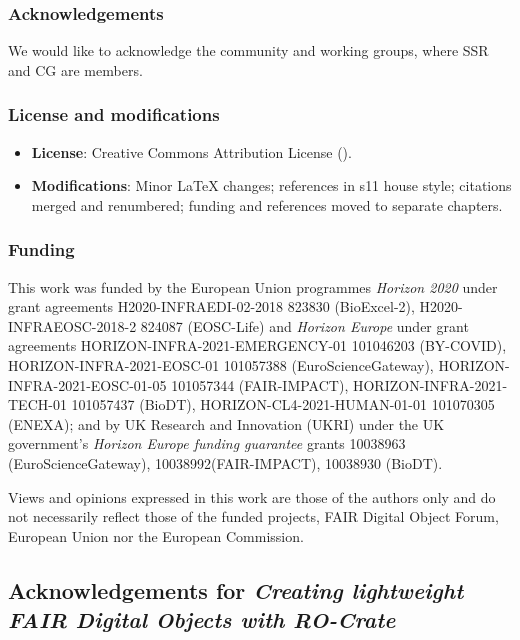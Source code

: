 \subsubsection*{Acknowledgements}

We would like to acknowledge the  community and working groups, where SSR and CG are members.


\subsubsection*{License and modifications}

\begin{itemize}
\tightlist
\item
  \textbf{License}: Creative Commons Attribution License
  ().
\item
  \textbf{Modifications}: Minor LaTeX changes; references in s11 house style; 
  citations merged and renumbered; 
  funding and references moved to separate chapters.
\end{itemize}

\subsubsection*{Funding}

This work was funded by the European Union programmes \emph{Horizon 2020} under grant agreements H2020-INFRAEDI-02-2018 823830 (BioExcel-2), H2020-INFRAEOSC-2018-2 824087 (EOSC-Life) and \emph{Horizon Europe} under grant agreements HORIZON-INFRA-2021-EMERGENCY-01 101046203 (BY-COVID), HORIZON-INFRA-2021-EOSC-01 101057388 (EuroScienceGateway), HORIZON-INFRA-2021-EOSC-01-05 101057344 (FAIR-IMPACT), HORIZON-INFRA-2021-TECH-01 101057437 (BioDT), HORIZON-CL4-2021-HUMAN-01-01 101070305 (ENEXA); and by UK Research and Innovation (UKRI) under the UK government’s \emph{Horizon Europe funding guarantee} grants 10038963 (EuroScienceGateway), 10038992(FAIR-IMPACT), 10038930 (BioDT).

Views and opinions expressed in this work are those of the authors only and do not necessarily reflect those of the funded projects, FAIR Digital Object Forum, European Union nor the European Commission.


\subsection{Acknowledgements for \textit{Creating lightweight FAIR Digital Objects with RO-Crate}}


